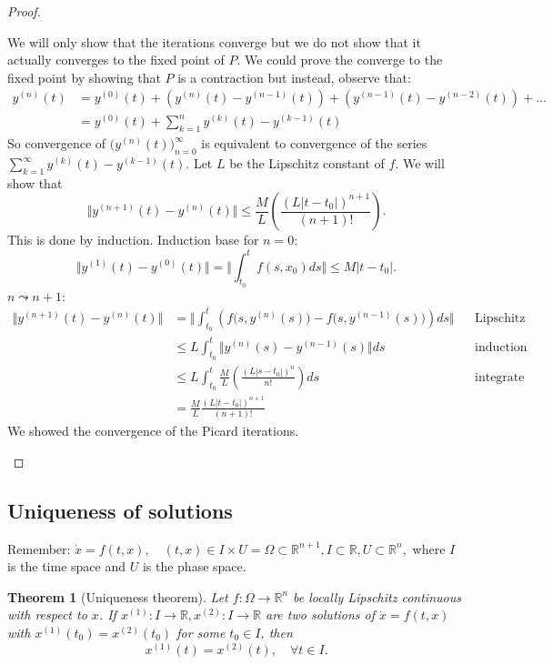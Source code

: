 \documentclass[hidelinks,a4paper, 11pt]{article}
\theoremstyle{plain}
\newtheorem{theorem}{Theorem}
\theoremstyle{break}
\theoremstyle{plain}
\theoremstyle{definition}
\begin{document}
\begin{proof}
\begin{enumerate}
		We will only show that the iterations converge but we do not show that it actually converges to the fixed point of $P$. We could prove the converge to the fixed point by showing that $P$ is a contraction but instead, observe that:
		\begin{align*}
			y^{(n)}(t) &= y^{(0)}(t) + (y^{(n)}(t) - y^{(n-1)}(t)) + (y^{(n-1)}(t) - y^{(n-2)}(t))+... \\
			&= y^{(0)}(t) + \sum^n_{k=1}y^{(k)}(t) - y^{(k-1)}(t)
		\end{align*}
		So convergence of $\big(y^{(n)}(t)\big)^{\infty}_{n=0}$ is equivalent to convergence of the series $\sum^{\infty}_{k=1}y^{(k)}(t) -y^{(k-1)}(t)$. Let $L$ be the Lipschitz constant of $f$. We will show that
		\[
			\Vert y^{(n+1)}(t) - y^{(n)}(t) \Vert \leq \frac{M}{L} \left( \frac{(L |t-t_0|)^{n+1}}{(n+1)!} \right).
		\]
		This is done by induction. Induction base for $n=0$:
		\[
			\Vert y^{(1)}(t) - y^{(0)}(t) \Vert = \Vert \int^t_{t_0} f(s,x_0) ds \Vert \leq M |t-t_0|.
		\]
		$n \leadsto n+1$:
		\begin{align*}
			\Vert y^{(n+1)}(t) - y^{(n)}(t) \Vert &= \Vert \int^t_{t_0} \left(f\big(s,y^{(n)}(s)\big) - f\big(s,y^{(n-1)}(s)\big)\right) ds \Vert && \text{Lipschitz continuous} \\
			&\leq L \int^t_{t_0}  \Vert y^{(n)}(s) - y^{(n-1)}(s) \Vert ds&& \text{induction basis} \\
			& \leq L \int^t_{t_0} \frac{M}{L}\left(\frac{(L |s-t_0|)^n}{n!}\right) ds && \text{integrate} \\
			&= \frac{M}{L}\frac{(L|t-t_0|)^{n+1}}{(n+1)!}
		\end{align*}
		We showed the convergence of the Picard iterations.
	\end{enumerate}
\end{proof}

\subsection{Uniqueness of solutions}



Remember: $\dot x = f(t,x), \quad (t,x) \in I \times U = \Omega \subset \mathbb R^{n+1}, I \subset \mathbb R, U \subset \mathbb R^n,$ where $I$ is the time space and $U$ is the phase space.

\begin{theorem}[Uniqueness theorem]
	Let $f: \Omega \to \mathbb R^n$ be locally Lipschitz continuous with respect to $x$. If $x^{(1)}: I \to \mathbb R, x^{(2)}: I \to \mathbb R$ are two solutions of $\dot x = f(t,x)$ with $x^{(1)}(t_0) = x^{(2)}(t_0)$ for some $t_0 \in I$, then $$x^{(1)}(t) = x^{(2)}(t), \quad \forall t \in I.$$
\end{theorem}
\end{document}
